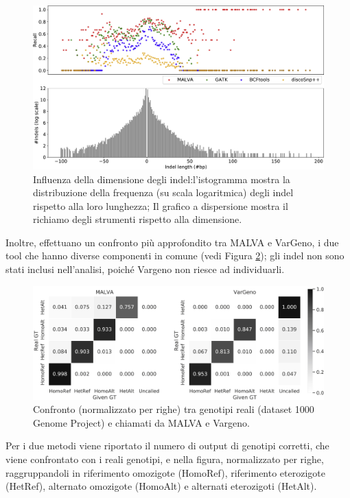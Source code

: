 \documentclass[../main.tex]{subfiles}
\begin{document}
\begin{figure}[h!]
	\centering
  	\captionsetup{justification=centering}
  	\includegraphics[scale=0.75]{images/gr2.jpg}
  	\caption{ Influenza della dimensione degli indel:l'istogramma mostra la distribuzione della frequenza (su scala logaritmica) degli indel rispetto alla loro lunghezza; Il grafico a dispersione mostra il richiamo degli strumenti rispetto alla dimensione.}
  	\label{fig:malvaIndel}
\end{figure}

\noindent
Inoltre, \cite{bernardini2019malva} effettuano un confronto più approfondito tra MALVA e VarGeno, i due tool che hanno diverse componenti in comune (vedi Figura \ref{fig:confronto3}); gli indel non sono stati inclusi nell'analisi, poiché Vargeno non riesce ad individuarli.

\begin{figure}[h!]
	\centering
  	\captionsetup{justification=centering}
  	\includegraphics[scale=1]{images/confronto3.jpg}
  	\caption{Confronto (normalizzato per righe) tra genotipi reali (dataset 1000 Genome Project) e chiamati da MALVA e Vargeno.}
  	\label{fig:confronto3}
\end{figure}

\noindent
Per i due metodi viene riportato il numero di output di genotipi corretti, che viene confrontato con i reali genotipi, e nella figura, normalizzato per righe, raggruppandoli in riferimento omozigote (HomoRef), riferimento eterozigote (HetRef), alternato omozigote (HomoAlt) e alternati eterozigoti (HetAlt).
\end{document}
